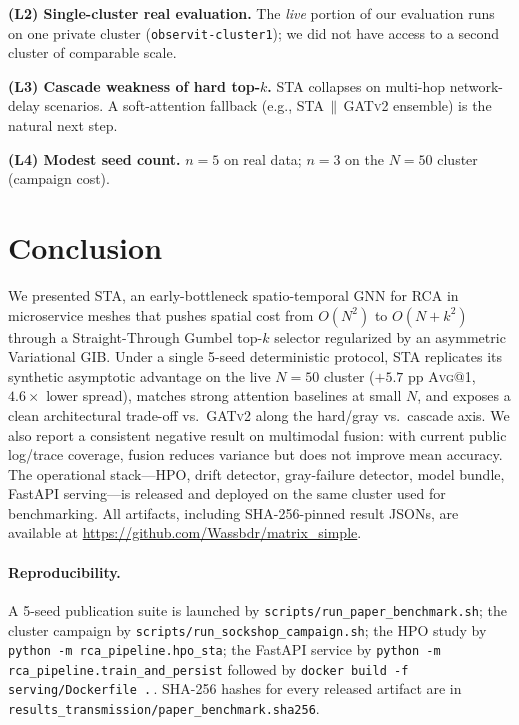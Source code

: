 \documentclass[11pt,a4paper]{article}
\makeatletter
\newcommand{\Avg}[1]{\textsc{Avg}@{#1}}
\newcommand{\STA}{\textsc{STA}}
\newcommand{\GATv}{\textsc{GATv2}}
\makeatother
\begin{document}
\textbf{(L2) Single-cluster real evaluation.} The \emph{live} portion of our
evaluation runs on one private cluster (\texttt{observit-cluster1}); we did
not have access to a second cluster of comparable scale.

\textbf{(L3) Cascade weakness of hard top-$k$.} \STA{} collapses on
multi-hop network-delay scenarios. A soft-attention fallback (e.g.,
\STA{}\,$\|$\,\GATv{} ensemble) is the natural next step.

\textbf{(L4) Modest seed count.} $n{=}5$ on real data; $n{=}3$ on the
$N{=}50$ cluster (campaign cost).

\section{Conclusion}

We presented \STA{}, an early-bottleneck spatio-temporal GNN for RCA in
microservice meshes that pushes spatial cost from $O(N^2)$ to $O(N + k^{2})$
through a Straight-Through Gumbel top-$k$ selector regularized by an
asymmetric Variational GIB. Under a single 5-seed deterministic protocol,
\STA{} replicates its synthetic asymptotic advantage on the live
$N{=}50$ cluster ($+5.7$ pp \Avg{1}, $4.6\times$ lower spread), matches
strong attention baselines at small $N$, and exposes a clean architectural
trade-off vs.\ \GATv{} along the hard/gray vs.\ cascade axis. We also report
a consistent negative result on multimodal fusion: with current public log/trace
coverage, fusion reduces variance but does not improve mean accuracy. The
operational stack---HPO, drift detector, gray-failure detector, model bundle,
FastAPI serving---is released and deployed on the same cluster used for
benchmarking. All artifacts, including SHA-256-pinned result JSONs, are
available at \url{https://github.com/Wassbdr/matrix_simple}.

\paragraph{Reproducibility.} A 5-seed publication suite is launched by
\texttt{scripts/run\_paper\_benchmark.sh}; the cluster campaign by
\texttt{scripts/run\_sockshop\_campaign.sh}; the HPO study by
\texttt{python -m rca\_pipeline.hpo\_sta}; the FastAPI service by
\texttt{python -m rca\_pipeline.train\_and\_persist} followed by
\texttt{docker build -f serving/Dockerfile .}\,. SHA-256 hashes for every
released artifact are in
\texttt{results\_transmission/paper\_benchmark.sha256}.
\end{document}
